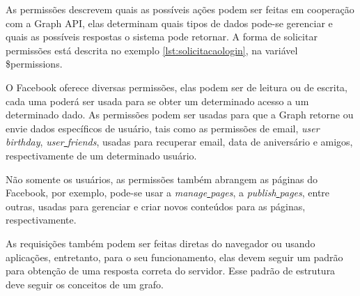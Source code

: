 As permissões descrevem quais as possíveis ações podem ser feitas em cooperação com a Graph API, elas determinam quais tipos de dados pode-se gerenciar e quais as possíveis respostas o sistema pode retornar. A forma de solicitar permissões está descrita no exemplo \ref{lst:solicitacaologin}, na variável \$permissions.

O Facebook oferece diversas permissões, elas podem ser de leitura ou de escrita, cada uma poderá ser usada para se obter um determinado acesso a um determinado dado. As permissões podem ser usadas para que a Graph retorne ou envie dados específicos de usuário, tais como as permissões de email, \textit{user\underline{{ }}birthday}, \textit{user\underline{{ }}friends}, usadas para recuperar email, data de aniversário e amigos, respectivamente de um determinado usuário.

Não somente os usuários, as permissões também abrangem as páginas do Facebook, por exemplo, pode-se usar a \textit{manage\underline{{ }}pages}, a \textit{publish\underline{{ }}pages}, entre outras, usadas para gerenciar e criar novos conteúdos para as páginas, respectivamente.

As requisições também podem ser feitas diretas do navegador ou usando aplicações, entretanto, para o seu funcionamento, elas devem seguir um padrão para obtenção de uma resposta correta do servidor. Esse padrão de estrutura deve seguir os conceitos de um grafo.

